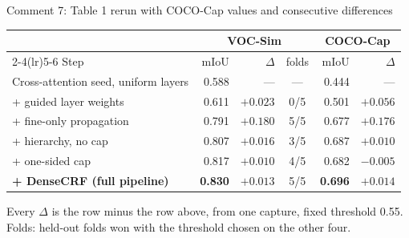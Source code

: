 
\begin{frame}{Comment 7: Table 1 rerun with COCO-Cap values and consecutive differences}
\begin{slidetable}
\begin{tabular}{lrrcrr}
\toprule
 & \multicolumn{3}{c}{VOC-Sim} & \multicolumn{2}{c}{COCO-Cap} \\
\cmidrule(lr){2-4}\cmidrule(lr){5-6}
Step & mIoU & $\Delta$ & folds & mIoU & $\Delta$ \\
\midrule
Cross-attention seed, uniform layers & 0.588 & ---      & --- & 0.444 & --- \\
+ guided layer weights               & 0.611 & $+0.023$ & 0/5 & 0.501 & $+0.056$ \\
+ fine-only propagation              & 0.791 & $+0.180$ & 5/5 & 0.677 & $+0.176$ \\
+ hierarchy, no cap                  & 0.807 & $+0.016$ & 3/5 & 0.687 & $+0.010$ \\
+ one-sided cap                      & 0.817 & $+0.010$ & 4/5 & 0.682 & $-0.005$ \\
\textbf{+ DenseCRF (full pipeline)}  & \textbf{0.830} & $+0.013$ & 5/5 & \textbf{0.696} & $+0.014$ \\
\bottomrule
\end{tabular}
\end{slidetable}
Every $\Delta$ is the row minus the row above, from one capture, fixed threshold 0.55. Folds: held-out folds won with the threshold chosen on the other four.
\end{frame}

